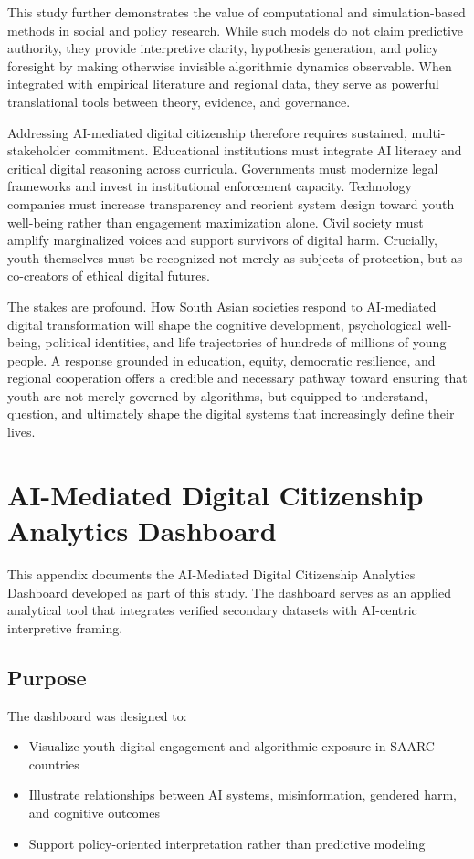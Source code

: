 \documentclass[12pt,a4paper]{report}
\begin{document}
This study further demonstrates the value of computational and simulation-based methods in social and policy research. While such models do not claim predictive authority, they provide interpretive clarity, hypothesis generation, and policy foresight by making otherwise invisible algorithmic dynamics observable. When integrated with empirical literature and regional data, they serve as powerful translational tools between theory, evidence, and governance.

Addressing AI-mediated digital citizenship therefore requires sustained, multi-stakeholder commitment. Educational institutions must integrate AI literacy and critical digital reasoning across curricula. Governments must modernize legal frameworks and invest in institutional enforcement capacity. Technology companies must increase transparency and reorient system design toward youth well-being rather than engagement maximization alone. Civil society must amplify marginalized voices and support survivors of digital harm. Crucially, youth themselves must be recognized not merely as subjects of protection, but as co-creators of ethical digital futures.

The stakes are profound. How South Asian societies respond to AI-mediated digital transformation will shape the cognitive development, psychological well-being, political identities, and life trajectories of hundreds of millions of young people. A response grounded in education, equity, democratic resilience, and regional cooperation offers a credible and necessary pathway toward ensuring that youth are not merely governed by algorithms, but equipped to understand, question, and ultimately shape the digital systems that increasingly define their lives.


\newpage

\appendix
\chapter{AI-Mediated Digital Citizenship Analytics Dashboard}
\label{app:ai_dashboard}

This appendix documents the AI-Mediated Digital Citizenship Analytics Dashboard developed as part of this study. The dashboard serves as an applied analytical tool that integrates verified secondary datasets with AI-centric interpretive framing.

\section{Purpose}
The dashboard was designed to:
\begin{itemize}
  \item Visualize youth digital engagement and algorithmic exposure in SAARC countries
  \item Illustrate relationships between AI systems, misinformation, gendered harm, and cognitive outcomes
  \item Support policy-oriented interpretation rather than predictive modeling
\end{itemize}
\end{document}
